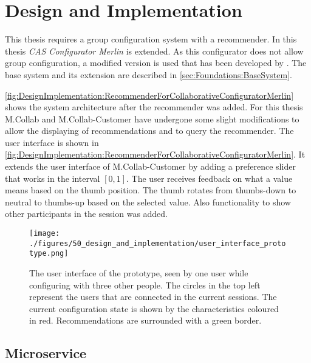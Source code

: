 \chapter{Design and Implementation}
\label{ch:DesignImplementation}

This thesis requires a group configuration system with a recommender. In this thesis \emph{CAS Configurator Merlin} \cite{IndustrySpecificProduct2020} is extended. As this configurator does not allow group configuration, a modified version is used that has been developed by \citeauthor{raabKollaborativeProduktkonfigurationEchtzeit2019} \cite{raabKollaborativeProduktkonfigurationEchtzeit2019}. The base system and its extension are described in \autoref{sec:Foundations:BaseSystem}.

\autoref{fig:DesignImplementation:RecommenderForCollaborativeConfiguratorMerlin} shows the system architecture after the recommender was added. For this thesis M.Collab and M.Collab-Customer have undergone some slight modifications to allow the displaying of recommendations and to query the recommender. The user interface is shown in \autoref{fig:DesignImplementation:RecommenderForCollaborativeConfiguratorMerlin}. It extends the user interface of M.Collab-Customer by adding a preference slider that works in the interval $[0,1]$. The user receives feedback on what a value means based on the thumb position. The thumb rotates from thumbs-down to neutral to thumbs-up based on the selected value. Also functionality to show other participants in the session was added.

\begin{figure}
    \centering
    \texttt{[image: ./figures/50\_design\_and\_implementation/user\_interface\_prototype.png]}
    \caption{The user interface of the prototype, seen by one user while configuring with three other people. The circles in the top left represent the users that are connected in the current sessions. The current configuration state is shown by the characteristics coloured in red. Recommendations are surrounded with a green border.}
    \label{fig:DesignImplementation:UserInterface}
\end{figure}


\section{Microservice}
\label{sec:DesignImplementation:Microservice}

